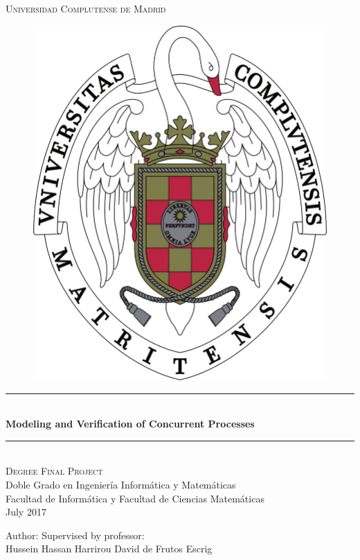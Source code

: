 \documentclass[11pt]{article}
\theoremstyle{definition}
\theoremstyle{plain}
\newcommand{\HRule}{\rule{\linewidth}{0.5mm}}
\begin{document}
\begin{titlepage}

\begin{center}

\textsc{\LARGE Universidad Complutense de Madrid}\\[1 cm]

\begin{figure}[h!]
	\centering
        \includegraphics[scale=0.1]{escudo} 
\end{figure}

\HRule \\[0.4cm]
{ \Huge \bfseries Modeling and Verification of Concurrent Processes }
\HRule \\[1.5 cm]

\textsc{\large Degree Final Project}\\

\large Doble Grado en Ingeniería Informática y Matemáticas \\

\large Facultad de Informática y Facultad de Ciencias Matemáticas\\
{July 2017}\\[6.5cm]

\end{center}


\begin{flushright}

\Large Author: 				\hfill 	\hfill \Large Supervised by professor:\\[8pt]
	
{\sf Hussein Hassan Harrirou 	\hfill  \hfill David de Frutos Escrig}\\

\end{flushright}

\end{titlepage}
\end{document}
